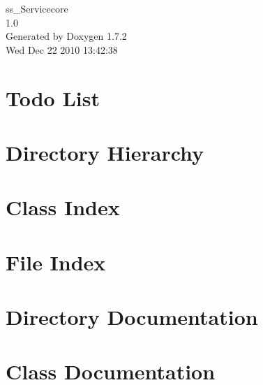 \documentclass[a4paper]{book}
\begin{document}
\hypersetup{pageanchor=false}
\begin{titlepage}
\vspace*{7cm}
\begin{center}
{\Large ss\_\-Servicecore \\[1ex]\large 1.0 }\\
\vspace*{1cm}
{\large Generated by Doxygen 1.7.2}\\
\vspace*{0.5cm}
{\small Wed Dec 22 2010 13:42:38}\\
\end{center}
\end{titlepage}
\clearemptydoublepage
{}
\tableofcontents
\clearemptydoublepage
{}
\hypersetup{pageanchor=true}
\chapter{Todo List}
\label{todo}
\hypertarget{todo}{}

\chapter{Directory Hierarchy}

\chapter{Class Index}

\chapter{File Index}

\chapter{Directory Documentation}







\chapter{Class Documentation}














\end{document}
